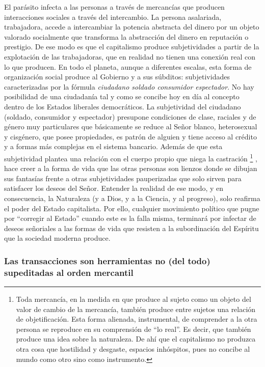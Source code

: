 \documentclass[
]{article}
\begin{document}
El parásito infecta a las personas a través de mercancías que producen
interacciones sociales a través del intercambio. La persona asalariada,
trabajadora, accede a intercambiar la potencia abstracta del dinero por
un objeto valorado socialmente que transforma la abstracción del dinero
en reputación o prestigio. De ese modo es que el capitalismo produce
subjetividades a partir de la explotación de las trabajadoras, que en
realidad no tienen una conexión real con lo que producen. En todo el
planeta, aunque a diferentes escalas, esta forma de organización social
produce al Gobierno y a sus súbditos: subjetividades caracterizadas por
la fórmula \emph{ciudadano soldado consumidor espectador}. No hay
posibilidad de una ciudadanía tal y como se concibe hoy en día al
concepto dentro de los Estados liberales democráticos. La subjetividad
del ciudadano (soldado, consumidor y espectador) presupone condiciones
de clase, raciales y de género muy particulares que básicamente se
reduce al Señor blanco, heterosexual y cisgénero, que posee propiedades,
es patrón de alguien y tiene acceso al crédito y a formas más complejas
en el sistema bancario. Además de que esta subjetividad plantea una
relación con el cuerpo propio que niega la castración \footnote{Toda
  mercancía, en la medida en que produce al sujeto como un objeto del
  valor de cambio de la mercancía, también produce entre sujetos una
  relación de objetificación. Esta forma alienada, instrumental, de
  comprender a la otra persona se reproduce en su comprensión de ``lo
  real''. Es decir, que también produce una idea sobre la naturaleza. De
  ahí que el capitalismo no produzca otra cosa que hostilidad y
  desgaste, espacios inhóspitos, pues no concibe al mundo como otro sino
  como instrumento.} , hace creer a la forma de vida que las otras
personas son lienzos donde se dibujan sus fantasías frente a otras
subjetividades pauperizadas que solo sirven para satisfacer los deseos
del Señor. Entender la realidad de ese modo, y en consecuencia, la
Naturaleza (y a Dios, y a la Ciencia, y al progreso), solo reafirma el
poder del Estado capitalista. Por ello, cualquier movimiento político
que pugne por ``corregir al Estado'' cuando este es la falla misma,
terminará por infectar de deseos señoriales a las formas de vida que
resisten a la subordinación del Espíritu que la sociedad moderna
produce.

\hypertarget{las-transacciones-son-herramientas-no-del-todo-supeditadas-al-orden-mercantil}{%
\subsubsection{Las transacciones son herramientas no (del todo)
supeditadas al orden
mercantil}\label{las-transacciones-son-herramientas-no-del-todo-supeditadas-al-orden-mercantil}}
\end{document}
